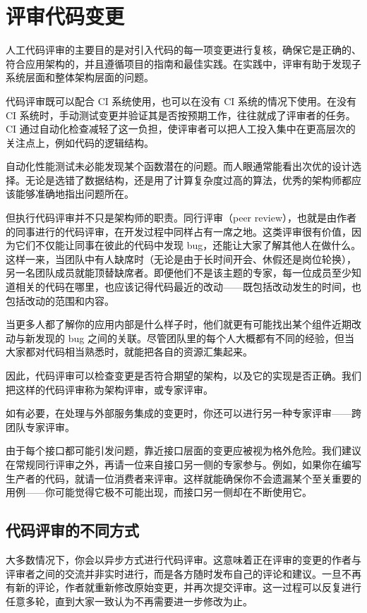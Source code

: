 \section{评审代码变更}

\label{idx:919}
人工代码评审的主要目的是对引入代码的每一项变更进行复核，确保它是正确的、符合应用架构的，并且遵循项目的指南和最佳实践。在实践中，评审有助于发现子系统层面和整体架构层面的问题。

代码评审既可以配合 CI 系统使用，也可以在没有 CI 系统的情况下使用。在没有 CI 系统时，手动测试变更并验证其是否按预期工作，往往就成了评审者的任务。CI 通过自动化检查减轻了这一负担，使评审者可以把人工投入集中在更高层次的关注点上，例如代码的逻辑结构。

自动化性能测试未必能发现某个函数潜在的问题。而人眼通常能看出次优的设计选择。无论是选错了数据结构，还是用了计算复杂度过高的算法，优秀的架构师都应该能够准确地指出问题所在。

但执行代码评审并不只是架构师的职责。同行评审（peer review），也就是由作者的同事进行的代码评审，在开发过程中同样占有一席之地。这类评审很有价值，因为它们不仅能让同事在彼此的代码中发现 bug，还能让大家了解其他人在做什么。这样一来，当团队中有人缺席时（无论是由于长时间开会、休假还是岗位轮换），另一名团队成员就能顶替缺席者。即便他们不是该主题的专家，每一位成员至少知道相关的代码在哪里，也应该记得代码最近的改动——既包括改动发生的时间，也包括改动的范围和内容。

\label{idx:920}
当更多人都了解你的应用内部是什么样子时，他们就更有可能找出某个组件近期改动与新发现的 bug 之间的关联。尽管团队里的每个人大概都有不同的经验，但当大家都对代码相当熟悉时，就能把各自的资源汇集起来。

因此，代码评审可以检查变更是否符合期望的架构，以及它的实现是否正确。我们把这样的代码评审称为架构评审，或专家评审。

如有必要，在处理与外部服务集成的变更时，你还可以进行另一种专家评审——跨团队专家评审。

由于每个接口都可能引发问题，靠近接口层面的变更应被视为格外危险。我们建议在常规同行评审之外，再请一位来自接口另一侧的专家参与。例如，如果你在编写生产者的代码，就请一位消费者来评审。这样就能确保你不会遗漏某个至关重要的用例——你可能觉得它极不可能出现，而接口另一侧却在不断使用它。

\subsection{代码评审的不同方式}

\label{idx:921}
大多数情况下，你会以异步方式进行代码评审。这意味着正在评审的变更的作者与评审者之间的交流并非实时进行，而是各方随时发布自己的评论和建议。一旦不再有新的评论，作者就重新修改原始变更，并再次提交评审。这一过程可以反复进行任意多轮，直到大家一致认为不再需要进一步修改为止。


